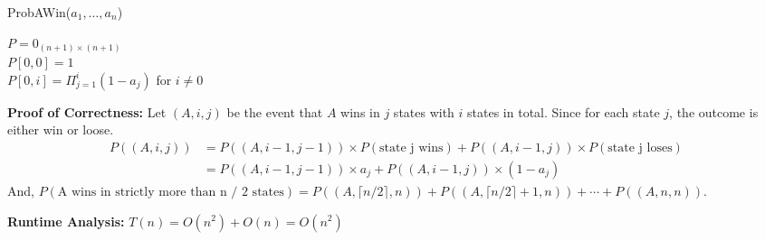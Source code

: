 \documentclass[11pt]{article}
\begin{document}
\begin{enumerate}
\begin{algorithm} [h]
    \caption{ProbAWin($a_1, \dots, a_n$)}
    $P = 0_{(n + 1) \times (n + 1)}$\\
    $P[0, 0] = 1$\\
    $P[0,i] = \Pi_{j = 1}^{i} (1 - a_j)$ for $i \neq 0$\\
\end{algorithm} 

\textbf{Proof of Correctness:} Let $(A, i, j)$ be the event that $A$ wins in $j$ states with $i$ states in total. 
Since for each state $j$, the outcome is either win or loose. 
\begin{align*}
    P((A, i, j)) & = P((A, i - 1, j - 1)) \times 
                    P(\text{state j wins}) + P((A, i - 1, j)) \times P(\text{state j loses}) \\
    & = P((A, i - 1, j - 1)) \times a_j + P((A, i - 1, j)) \times (1 - a_j)
\end{align*}
And, $P(\text{A wins in strictly more than n / 2 states}) = P((A, \lceil n / 2 \rceil, n)) + 
P((A, \lceil n / 2 \rceil + 1, n)) + \cdots + P((A, n, n))$.

\textbf{Runtime Analysis:} $T(n) = O(n^2) + O(n) = O(n^2)$
\end{enumerate}
\end{document}
